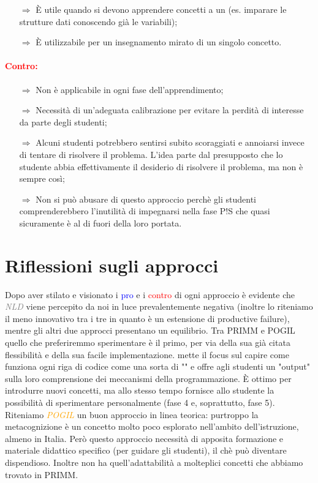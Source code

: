\begin{itemize}
    \item [$\Rightarrow$] È utile quando si devono apprendere concetti a un  (es. imparare le strutture dati conoscendo già le variabili);
    \item [$\Rightarrow$] È utilizzabile per un insegnamento mirato di un singolo concetto.
\end{itemize}

\paragraph{\textcolor{red}{Contro:}}

\begin{itemize}
    \item [$\Rightarrow$] Non è applicabile in ogni fase dell'apprendimento;
    \item [$\Rightarrow$] Necessità di un'adeguata calibrazione per evitare la perdità di interesse da parte degli studenti;
    \item [$\Rightarrow$] Alcuni studenti potrebbero sentirsi subito scoraggiati e annoiarsi invece di tentare di risolvere il problema. 
    L'idea parte dal presupposto che lo studente abbia effettivamente il desiderio di risolvere il problema, ma non è sempre così;
    \item [$\Rightarrow$] Non si può abusare di questo approccio perchè gli studenti comprenderebbero l'inutilità di impegnarsi nella fase P!S che quasi sicuramente è al di fuori della loro portata. 
\end{itemize}

\section{Riflessioni sugli approcci}

Dopo aver stilato e visionato i \textcolor{blue}{pro} e i \textcolor{red}{contro} di ogni 
approccio è evidente che \textit{\textcolor{gray}{NLD}} viene percepito da noi in luce prevalentemente negativa (inoltre lo
riteniamo il meno innovativo tra i tre in quanto è un estensione di productive failure), mentre gli altri
due approcci presentano un equilibrio. Tra PRIMM e POGIL quello che preferiremmo sperimentare è il primo, per via 
della sua già citata flessibilità e della sua facile implementazione.  mette il focus
sul capire come funziona ogni riga di codice come una sorta di "" e offre agli studenti
un "output" sulla loro comprensione dei meccanismi della programmazione. È ottimo per introdurre nuovi concetti,
ma allo stesso tempo fornisce allo studente la possibilità di sperimentare personalmente (fase 4 e, soprattutto, fase 5).
Riteniamo \textit{\textcolor{orange}{POGIL}} un buon approccio in linea teorica: purtroppo la metacognizione è un concetto
molto poco esplorato nell'ambito dell'istruzione, almeno in Italia. Però questo approccio necessità di apposita formazione e 
materiale didattico specifico (per guidare gli studenti), il chè può diventare dispendioso. Inoltre non ha quell'adattabilità
a molteplici concetti che abbiamo trovato in PRIMM.